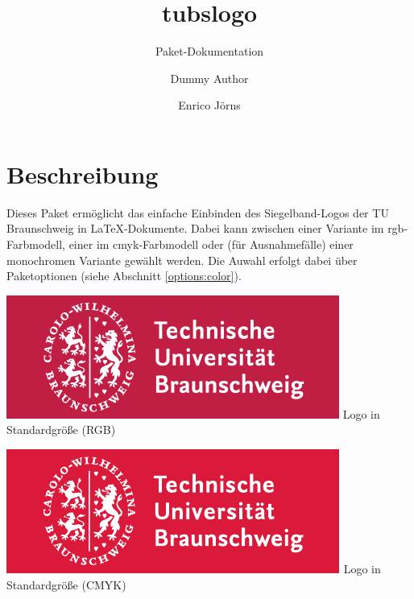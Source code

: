 \documentclass{scrartcl}
\title{tubslogo}
\subtitle{Paket-Dokumentation}
\author{Dummy Author \and Enrico Jörns}
\begin{document}
\maketitle

\tubslogo

\section{Beschreibung}

Dieses Paket ermöglicht das einfache Einbinden des Siegelband-Logos
der TU Braunschweig in \LaTeX-Dokumente.
Dabei kann zwischen einer Variante im rgb-Farbmodell, einer im
cmyk-Farbmodell oder (für Ausnahmefälle) einer monochromen Variante gewählt
werden. Die Auwahl erfolgt dabei über Paketoptionen
(siehe Abschnitt \ref{options:color}).

\begin{minipage}{0.5\textwidth}
  \centering
  \includegraphics[width=\tulogoBaseWidth]{TUBraunschweig-rgb}
  {\sffamily Logo in Standardgröße (RGB)}
\end{minipage}
\begin{minipage}{0.5\textwidth}
  \centering
  \includegraphics[width=\tulogoBaseWidth]{TUBraunschweig_4C}
  {\sffamily Logo in Standardgröße (CMYK)}
\end{minipage}
\end{document}
